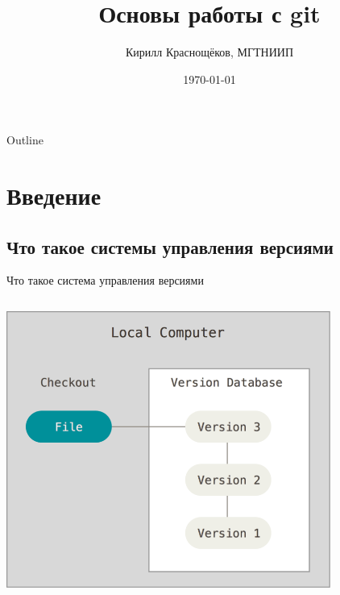 \documentclass[presentation]{beamer}
\author[]{Кирилл Краснощёков, МГТНИИП}
\date{\today}
\title{Основы работы с git}
\begin{document}
\maketitle
\begin{frame}{Outline}
\tableofcontents
\end{frame}


\section{Введение}
\label{sec:org356d7fa}
\subsection{Что такое системы управления версиями}
\label{sec:orgc1e16f9}
\begin{frame}[label={sec:orgf992b09}]{Что такое система управления версиями}
\begin{columns}
\begin{column}{0.65\columnwidth}
\begin{center}
\includegraphics[width=0.8\textwidth]{./01_vcs_00_what.png}
\end{center}
\end{column}


\end{columns}
\end{frame}
\end{document}
